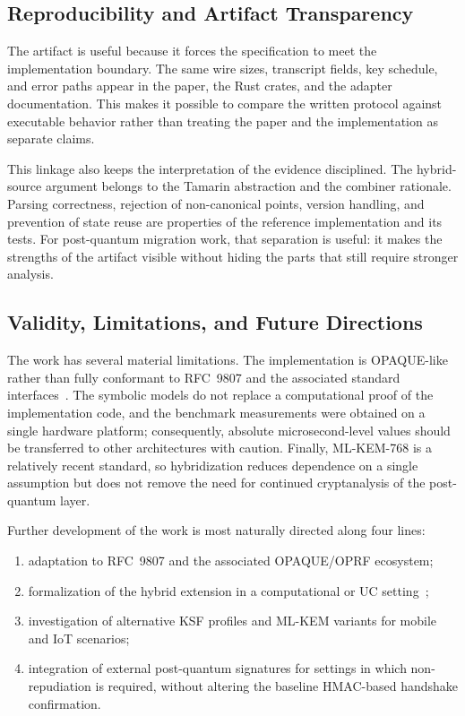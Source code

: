\documentclass[preprint,12pt]{elsarticle}
\theoremstyle{remark}
\begin{document}
\subsection{Reproducibility and Artifact Transparency}

The artifact is useful because it forces the specification to meet the
implementation boundary. The same wire sizes, transcript fields, key
schedule, and error paths appear in the paper, the Rust crates, and the
adapter documentation. This makes it possible to compare the written
protocol against executable behavior rather than treating the paper and
the implementation as separate claims.

This linkage also keeps the interpretation of the evidence disciplined.
The hybrid-source argument belongs to the Tamarin abstraction and the
combiner rationale. Parsing correctness, rejection of non-canonical
points, version handling, and prevention of state reuse are properties
of the reference implementation and its tests. For post-quantum migration
work, that separation is useful: it makes the strengths of the artifact
visible without hiding the parts that still require stronger analysis.

\subsection{Validity, Limitations, and Future Directions}

The work has several material limitations. The
implementation is OPAQUE-like rather than fully conformant to RFC~9807
and the associated standard interfaces~\cite{ietf-opaque}. The
symbolic models do not replace a computational proof of the
implementation code, and the benchmark measurements were obtained on a
single hardware platform; consequently, absolute microsecond-level
values should be transferred to other architectures with caution.
Finally, ML-KEM-768 is a relatively recent standard, so hybridization
reduces dependence on a single assumption but does not remove the need
for continued cryptanalysis of the post-quantum layer.

Further development of the work is most naturally directed along four
lines:
\begin{enumerate}
  \item adaptation to RFC~9807 and the associated OPAQUE/OPRF
        ecosystem;
  \item formalization of the hybrid extension in a computational or UC
        setting~\cite{canetti2001};
  \item investigation of alternative KSF profiles and ML-KEM variants
        for mobile and IoT scenarios;
  \item integration of external post-quantum signatures for settings in
        which non-repudiation is required, without altering the baseline
        HMAC-based handshake confirmation.
\end{enumerate}
\end{document}

